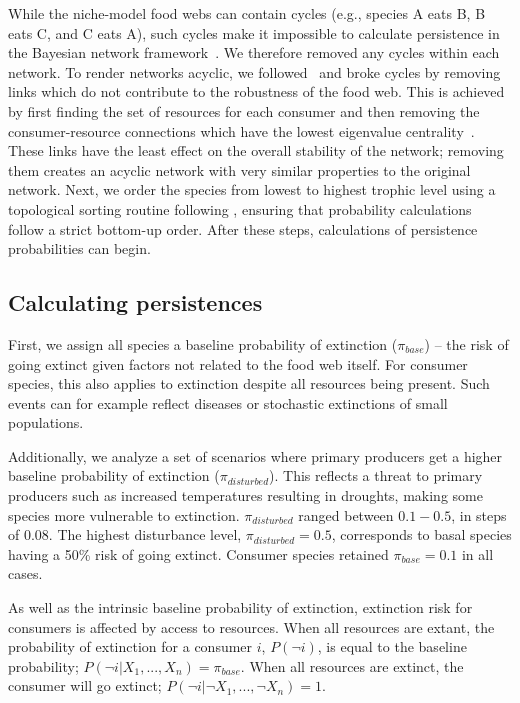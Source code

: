 \documentclass[12pt]{article}
\begin{document}
\begin{spacing}{2.0}
		While the niche-model food webs can contain cycles (e.g., species A eats B, B eats C, and C eats A), such cycles make it impossible to calculate persistence in the Bayesian network framework~\citep{Tarjan1972}. We therefore removed any cycles within each network.
		To render networks acyclic, we followed~\citet{Allesina2009} and broke cycles by removing links which do not contribute to the robustness of the food web.
		This is achieved by first finding the set of resources for each consumer and then removing the consumer-resource connections which have the lowest eigenvalue centrality~\citep{Allesina2009}.
		These links have the least effect on the overall stability of the network; removing them creates an acyclic network with very similar properties to the original network.
		Next, we order the species from lowest to highest trophic level using a topological sorting routine following \citep{Tarjan1972, Allesinaetal2005}, ensuring that probability calculations follow a strict bottom-up order. 
        After these steps, calculations of persistence probabilities can begin.

	\subsection*{Calculating persistences}	

		First, we assign all species a baseline probability of extinction ($\pi_{base}$) -- the risk of going extinct given factors not related to the food web itself. 
		For consumer species, this also applies to extinction despite all resources being present. 
		Such events can for example reflect diseases or stochastic extinctions of small populations. 


		Additionally, we analyze a set of scenarios where primary producers get a higher baseline probability of extinction ($\pi_{disturbed}$). 
		This reflects a threat to primary producers such as increased temperatures resulting in droughts, making some species more vulnerable to extinction.
		$\pi_{disturbed}$ ranged between $0.1-0.5$, in steps of $0.08$. The highest disturbance level, $\pi_{disturbed} = 0.5$, corresponds to basal species having a 50\% risk of going extinct. 
		Consumer species retained $\pi_{base}=0.1$ in all cases.
		
		
		As well as the intrinsic baseline probability of extinction, extinction risk for consumers is affected by access to resources. 
		When all resources are extant, the probability of extinction for a consumer $i$, $P(\lnot i)$, is equal to the baseline probability; $P(\lnot i|X_{1},...,X_{n}) = \pi_{base}$. 
		When all resources are extinct, the consumer will go extinct; $P(\lnot i|\lnot X_{1},...,\lnot X_{n})=1$. 


\end{spacing}
\end{document}

